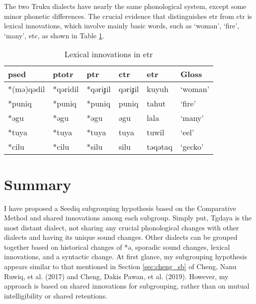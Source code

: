 The two Truku dialects have nearly the same phonological system, except some minor phonetic differences. The crucial evidence that distinguishes \acl{etr} from \acl{ctr} is lexical innovations, which involve mainly basic words, such as `woman', `fire', `many', etc, as shown in Table \ref{tab:etrlex}.

\begin{table}[!hbtp]
\centering
\caption{Lexical innovations in \acl{etr}}
\label{tab:etrlex}
\begin{tabular}{llllll}
\hline
\ac{psed}      & \ac{ptotr}   & \ac{ptr}     & \acs{ctr}   & \acs{etr}   & Gloss               \\ \hline
*(mə)qədil & *qəridil & *qəriɟil & qəriɟil & kuyuh   & `woman'         \\
*puniq   & *puniq   & *puniq   & puniq   & tahut   & `fire'          \\
*əgu     & *əgu     & *əgu     & əgu     & lala    & `many'          \\
*tuya    & *tuya    & *tuya    & tuya    & tuwil   & `eel'           \\
*cilu    & *cilu    & *silu    & silu    & təqətaq & `gecko'         \\ \hline
\end{tabular}
\end{table}

\section{Summary}

I have proposed a Seediq subgrouping hypothesis based on the Comparative Method and shared innovations among each subgroup. Simply put, Tgdaya is the most distant dialect, not sharing any crucial phonological changes with other dialects and having its unique sound changes. Other dialects can be grouped together based on historical changes of *ə, sporadic sound changes, lexical innovations, and a syntactic change. At first glance, my subgrouping hypothesis appears similar to that mentioned in Section \ref{sec:cheng_sb} of Cheng, Nanu Ruwiq, et al. (2017) and Cheng, Dakis Pawan, et al. (2019). However, my approach is based on shared innovations for subgrouping, rather than on mutual intelligibility or shared retentions.